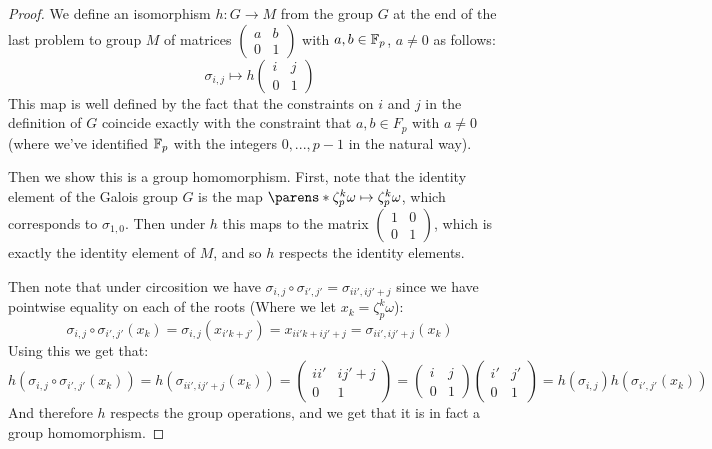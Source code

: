 \documentclass[11pt]{article}
\begin{document}
\begin{proof}
  We define an isomorphism $h: G \rightarrow M$ from the group $G$ at the end of the last problem to group $M$ of matrices $\begin{pmatrix} a & b \\ 0 & 1 \end{pmatrix}$ with $a,b \in \mathbb{F}_p$, $a \ne 0$ as follows:
  \begin{equation*}
    \sigma_{i,j}
    \mapsto{h}
    \begin{pmatrix} i & j \\ 0 & 1 \end{pmatrix}
  \end{equation*}
  This map is well defined by the fact that the constraints on $i$ and $j$ in the definition of $G$ coincide exactly with the constraint that $a,b \in F_p$ with $a \ne 0$ (where we've identified $\mathbb{F}_p$ with the integers $0,...,p-1$ in the natural way).

  Then we show this is a group homomorphism.
  First, note that the identity element of the Galois group $G$ is the map $\parens*{\zeta_p^k\omega \mapsto \zeta_p^k\omega}$, which corresponds to $\sigma_{1,0}$.
  Then under $h$ this maps to the matrix $\begin{pmatrix} 1 & 0 \\ 0 & 1 \end{pmatrix}$, which is exactly the identity element of $M$, and so $h$ respects the identity elements.

  Then note that under circosition we have $\sigma_{i,j} \circ \sigma_{i',j'} = \sigma_{ii', ij' + j}$ since we have pointwise equality on each of the roots (Where we let $x_k = \zeta_p^k\omega$):
  \begin{equation*}
    \sigma_{i,j} \circ \sigma_{i',j'} (x_k)
    = \sigma_{i,j}(x_{i'k + j'})
    = x_{ii'k + ij' + j}
    = \sigma_{ii', ij' + j}(x_k)
  \end{equation*}
  Using this we get that:
  \begin{equation*}
    h(\sigma_{i,j} \circ \sigma_{i',j'} (x_k))
    = h(\sigma_{ii', ij' + j}(x_k))
    = \begin{pmatrix} ii' & ij' + j \\ 0 & 1 \end{pmatrix}
    = \begin{pmatrix} i & j \\ 0 & 1 \end{pmatrix}\begin{pmatrix} i' & j' \\ 0 & 1 \end{pmatrix}
    = h(\sigma_{i,j}) h( \sigma_{i',j'} (x_k))
  \end{equation*}
  And therefore $h$ respects the group operations, and we get that it
  is in fact a group homomorphism.


\end{proof}
\end{document}
